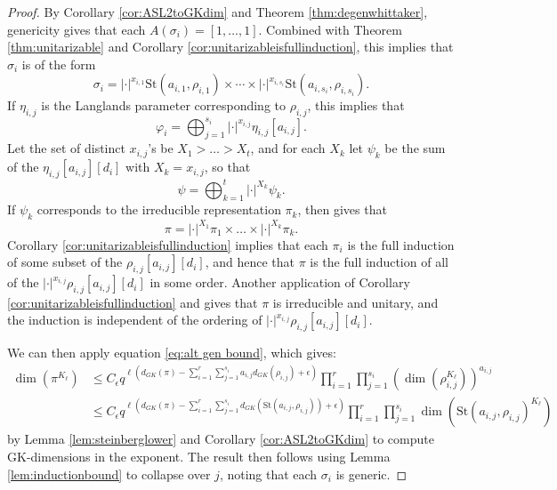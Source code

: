 \documentclass{amsart}
\newcommand{\lf}{\left}
\newcommand{\ri}{\right}
\newcommand{\St}{\mathrm{St}}
\newcommand{\eps}{\epsilon}
\newcommand{\1}{\m 1}
\theoremstyle{remark}
\theoremstyle{definition}
\numberwithin{equation}{subsection}
\begin{document}
\begin{proof}
By Corollary \ref{cor:ASL2toGKdim} and Theorem \ref{thm:degenwhittaker}, genericity gives that each $A(\sigma_i) = [1, \ldots, 1]$.  Combined with Theorem \ref{thm:unitarizable} and Corollary \ref{cor:unitarizableisfullinduction}, this implies that $\sigma_i$ is of the form
\[
\sigma_i = |\cdot|^{x_{i,1}} \St(a_{i,1}, \rho_{i,1}) \times \cdots \times |\cdot|^{x_{i,s_i}}\St(a_{i, s_i}, \rho_{i, s_i}).
\]
If $\eta_{i,j}$ is the Langlands parameter corresponding to $\rho_{i,j}$, this implies that
\[
\varphi_i = \bigoplus_{j=1}^{s_i} |\cdot|^{x_{i,j}} \eta_{i,j}[a_{i,j}].
\]
Let the set of distinct $x_{i,j}$'s be $X_1 > \ldots > X_t$, and for each $X_k$ let $\psi_k$ be the sum of the $\eta_{i,j}[a_{i,j}][d_i]$ with $X_k = x_{i,j}$, so that
\[
\psi = \bigoplus_{k=1}^t |\cdot|^{X_k} \psi_k.
\]
If $\psi_k$ corresponds to the irreducible representation $\pi_k$, then \cite[p. 27--28]{Mok} gives that
\[
\pi = |\cdot|^{X_1} \pi_1 \times \ldots \times |\cdot|^{X_k} \pi_k.
\]
Corollary \ref{cor:unitarizableisfullinduction} implies that each $\pi_i$ is the full induction of some subset of the $\rho_{i,j}[a_{i,j}][d_i]$, and hence that $\pi$ is the full induction of all of the $|\cdot|^{x_{i,j}} \rho_{i,j}[a_{i,j}][d_i]$ in some order.  Another application of Corollary \ref{cor:unitarizableisfullinduction} and \cite[Thm 1.9]{Zel80} gives that $\pi$ is irreducible and unitary, and the induction is independent of the ordering of $|\cdot|^{x_{i,j}} \rho_{i,j}[a_{i,j}][d_i]$.

We can then apply equation \eqref{eq:alt gen bound}, which gives:
\begin{align*}
\dim(\pi^{K_\ell}) &\leq C_\eps q^{\ell (d_{GK}(\pi) - \sum_{i=1}^r \sum_{j=1}^{s_i} a_{i, j} d_{GK}(\rho_{i,j})+\eps)} \prod_{i=1}^r \prod_{j=1}^{s_i} \lf( \dim(\rho_{i,j}^{K_\ell}) \ri)^{a_{i,j}} \\
&\leq C_\eps q^{\ell (d_{GK}(\pi) - \sum_{i=1}^r \sum_{j=1}^{s_i}  d_{GK}(\St(a_{i,j}, \rho_{i,j}))+\eps)} \prod_{i=1}^r \prod_{j=1}^{s_i} \dim(\St(a_{i,j}, \rho_{i,j})^{K_\ell})
\end{align*}
by Lemma \ref{lem:steinberglower} and Corollary \ref{cor:ASL2toGKdim} to compute GK-dimensions in the exponent. The result then follows using Lemma \ref{lem:inductionbound} to collapse over $j$, noting that each $\sigma_i$ is generic. 
\end{proof}
\end{document}

